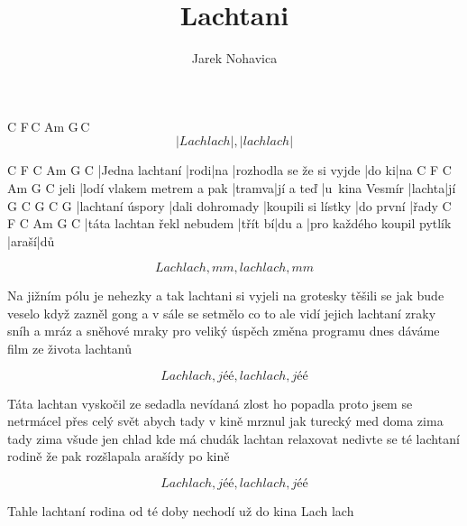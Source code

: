 \documentclass{song}
\author{Jarek Nohavica}
\title{Lachtani}
\begin{document}
   C         F\,C Am        G\,C
\[ |Lach lach|,   |lach lach| \]
\endstrophe

\strophe
C               F    C   Am                       G     C
|Jedna lachtaní |rodi|na |rozhodla se že si vyjde |do ki|na
     C                         F      C         Am             G      C
jeli |lodí vlakem metrem a pak |tramva|jí a teď |u~kina Vesmír |lachta|jí
G                C               G                  C         G
|lachtaní úspory |dali dohromady |koupili si lístky |do první |řady
C                          F       C     Am                         G     C
|táta lachtan řekl nebudem |třít bí|du a |pro každého koupil pytlík |araší|dů
\endstrophe

\[ Lach lach, mm, lach lach, mm \]
\endstrophe

\strophe*
Na jižním pólu je nehezky a tak lachtani si vyjeli na grotesky
těšili se jak bude veselo když zazněl gong a v sále se setmělo
co to ale vidí jejich lachtaní zraky sníh a mráz a sněhové mraky
pro veliký úspěch změna programu dnes dáváme film ze života lachtanů
\endstrophe

\[ Lach lach, jéé, lach lach, jéé \]
\endstrophe

\strophe*
Táta lachtan vyskočil ze sedadla nevídaná zlost ho popadla
proto jsem se netrmácel přes celý svět abych tady v kině mrznul jak turecký med
doma zima tady zima všude jen chlad kde má chudák lachtan relaxovat
nedivte se té lachtaní rodině že pak rozšlapala arašídy po kině
\endstrophe

\[ Lach lach, jéé, lach lach, jéé \]
\endstrophe

\strophe*
Tahle lachtaní rodina
od té doby nechodí už do kina
Lach lach
\endstrophe
\end{document}
